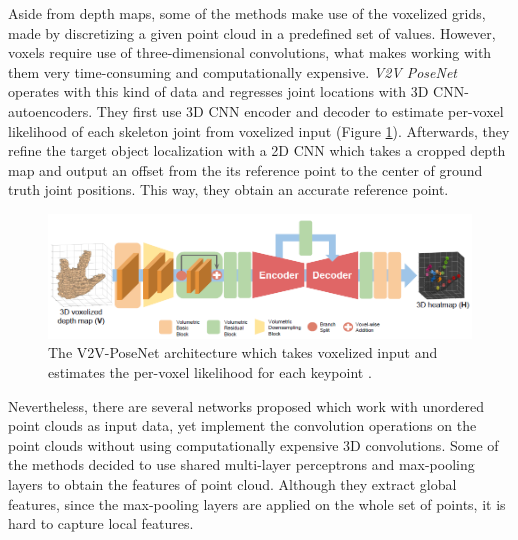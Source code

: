 \vspace{5mm}
\noindent Aside from depth maps, some of the methods make use of the voxelized grids, made by discretizing a given point cloud in a predefined set of values. However, voxels require use of three-dimensional convolutions, what makes working with them very time-consuming and computationally expensive. \textit{V2V PoseNet} \cite{DBLP:journals/corr/abs-1711-07399} operates with this kind of data and regresses joint locations with 3D CNN-autoencoders. They first use 3D CNN encoder and decoder to estimate per-voxel likelihood of each skeleton joint from voxelized input (Figure \ref{fig:v2vposenet}). Afterwards, they refine the target object localization with a 2D CNN which takes a cropped depth map and output an offset from the its reference point to the center of ground truth joint positions. This way, they obtain an accurate reference point.\par

\vspace{5mm}
\begin{figure}[H]
\begin{center}
  \includegraphics[width=\textwidth]{images/related_work/v2vposenet.PNG}
  \caption[The V2V-PoseNet architecture \cite{DBLP:journals/corr/abs-1711-07399}.]{The V2V-PoseNet architecture which takes voxelized input and estimates the per-voxel likelihood for each keypoint \cite{DBLP:journals/corr/abs-1711-07399}.}
  \label{fig:v2vposenet}
\end{center}
\end{figure}



\noindent Nevertheless, there are several networks proposed which work with unordered point clouds as input data, yet implement the convolution operations on the point clouds without using computationally expensive 3D convolutions. Some of the methods decided to use shared multi-layer perceptrons and max-pooling layers to obtain the features of point cloud. Although they extract global features, since the max-pooling layers are applied on the whole set of points, it is hard to capture local features.\par
\vspace{5mm}


